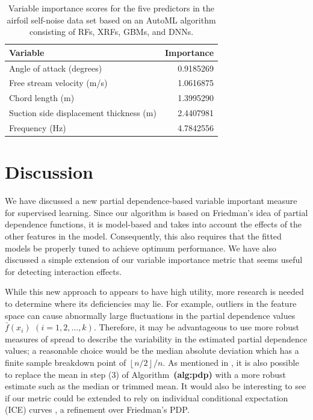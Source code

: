 \documentclass[12pt]{article}
\def\ref#1{\textbf{(#1)}}
\begin{document}
\begin{table}[!htb]
  \centering
  \begin{tabular}{lr}
    \toprule
    Variable                                & Importance\\
    \midrule
    Angle of attack (degrees)               & 0.9185269\\
    Free stream velocity (m/s)              & 1.0616875\\
    Chord length (m)                        & 1.3995290\\
    Suction side displacement thickness (m) & 2.4407981\\
    Frequency (Hz)                          & 4.7842556\\
    \bottomrule
  \end{tabular}
  \caption{Variable importance scores for the five predictors in the airfoil self-noise data set based on an AutoML algorithm consisting of RFs, XRFs, GBMs, and DNNs. \label{tab:aml-vi}}
\end{table}


\section{Discussion}
\label{sec:conc}

We have discussed a new partial dependence-based variable important measure for supervised learning. Since our algorithm is based on Friedman's idea of partial dependence functions, it is model-based and takes into account the effects of the other features in the model. Consequently, this also requires that the fitted models be properly tuned to achieve optimum performance. We have also discussed a simple extension of our variable importance metric that seems useful for detecting interaction effects.

While this new approach to appears to have high utility, more research is needed to determine where its deficiencies may lie. For example, outliers in the feature space can cause abnormally large fluctuations in the partial dependence values $\bar{f}\left(x_{i}\right)$ $\left(i = 1, 2, \dots, k\right)$. Therefore, it may be advantageous to use more robust measures of spread to describe the variability in the estimated partial dependence values; a reasonable choice would be the median absolute deviation which has a finite sample breakdown point of $\left\lfloor{n / 2}\right\rfloor / n$. As mentioned in \citet{pdp-greenwell-2017}, it is also possible to replace the mean in step (3) of Algorithm~\ref{alg:pdp} with a more robust estimate such as the median or trimmed mean. It would also be interesting to see if our metric could be extended to rely on individual conditional expectation (ICE) curves \citep{goldstein-peeking-2015}, a refinement over Friedman's PDP.
\end{document}
